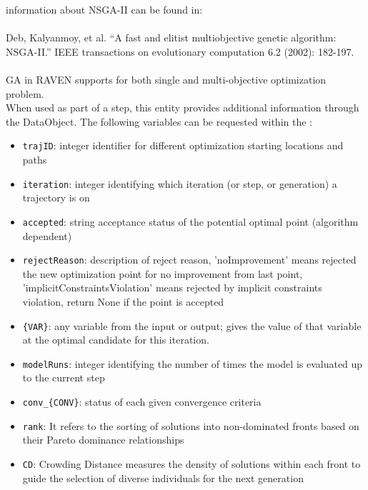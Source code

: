  information about NSGA-II can be found in:\\\\                              Deb, Kalyanmoy, et al.
  ``A fast and elitist multiobjective genetic algorithm: NSGA-II.'' IEEE transactions on
  evolutionary computation 6.2 (2002): 182-197.\\\\                              GA in RAVEN
  supports for both single and multi-objective optimization problem.
\vspace{7pt} \\When used as part of a  step, this entity provides
        additional information through the  DataObject. The
        following variables can be requested within the :
        \begin{itemize}
          \item \texttt{trajID}: integer identifier for different optimization starting locations and paths
             \item \texttt{iteration}: integer identifying which iteration (or step, or generation) a trajectory is on
             \item \texttt{accepted}: string acceptance status of the potential optimal point (algorithm dependent)
             \item \texttt{rejectReason}: description of reject reason, 'noImprovement' means rejected the new optimization point for no improvement from last point, 'implicitConstraintsViolation' means rejected by implicit constraints violation, return None if the point is accepted
             \item \texttt{\{VAR\}}: any variable from the  input or output; gives the value of that variable at the optimal candidate for this iteration.
             \item \texttt{modelRuns}: integer identifying the number of times the model is evaluated up to the current step
             \item \texttt{conv\_\{CONV\}}: status of each given convergence criteria
             \item \texttt{rank}: It refers to the sorting of solutions into non-dominated fronts based on their Pareto dominance relationships
             \item \texttt{CD}: Crowding Distance measures the density of solutions within each front to guide the selection of diverse individuals for the next generation

\end{itemize}
